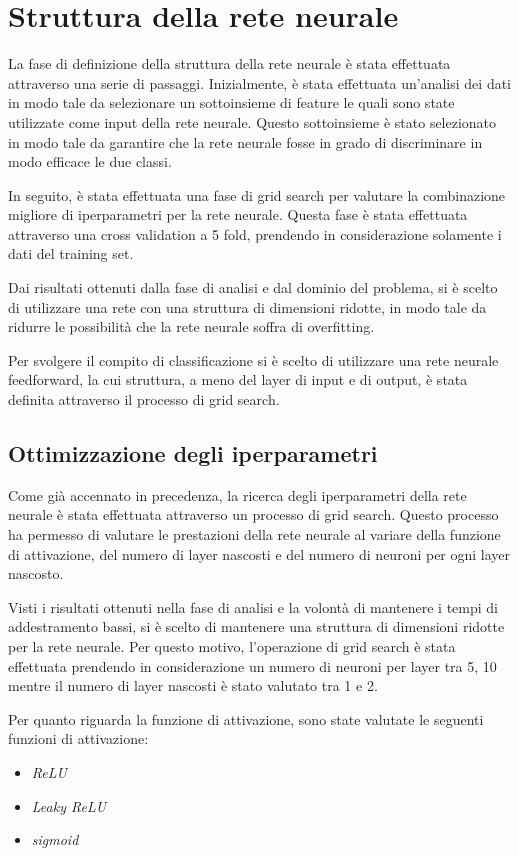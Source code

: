 \section{Struttura della rete neurale}
La fase di definizione della struttura della rete neurale è stata effettuata
attraverso una serie di passaggi. Inizialmente, è stata effettuata un'analisi
dei dati in modo tale da selezionare un sottoinsieme di feature le quali sono
state utilizzate come input della rete neurale. Questo sottoinsieme è stato
selezionato in modo tale da garantire che la rete neurale fosse in grado di
discriminare in modo efficace le due classi.

In seguito, è stata effettuata una fase di grid search per valutare la combinazione
migliore di iperparametri per la rete neurale. Questa fase è stata effettuata
attraverso una cross validation a 5 fold, prendendo in considerazione solamente
i dati del training set.

Dai risultati ottenuti dalla fase di analisi e dal dominio del problema, si è
scelto di utilizzare una rete con una struttura di dimensioni ridotte, in modo
tale da ridurre le possibilità che la rete neurale soffra di overfitting.

Per svolgere il compito di classificazione si è scelto di utilizzare una rete
neurale feedforward, la cui struttura, a meno del layer di input e di output, è
stata definita attraverso il processo di grid search.
\subsection{Ottimizzazione degli iperparametri}
Come già accennato in precedenza, la ricerca degli iperparametri della rete neurale
è stata effettuata attraverso un processo di grid search. Questo processo ha
permesso di valutare le prestazioni della rete neurale al variare della funzione
di attivazione, del numero di layer nascosti e del numero di neuroni per ogni
layer nascosto.

Visti i risultati ottenuti nella fase di analisi e la volontà di mantenere i
tempi di addestramento bassi, si è scelto di mantenere una struttura di dimensioni
ridotte per la rete neurale. Per questo motivo, l'operazione di grid search è
stata effettuata prendendo in considerazione un numero di neuroni per layer
tra 5, 10 mentre il numero di layer nascosti è stato valutato tra 1 e 2.

Per quanto riguarda la funzione di attivazione, sono state valutate le seguenti
funzioni di attivazione:
\begin{itemize}
    \item \textit{ReLU}
    \item \textit{Leaky ReLU}
    \item \textit{sigmoid}
\end{itemize}

